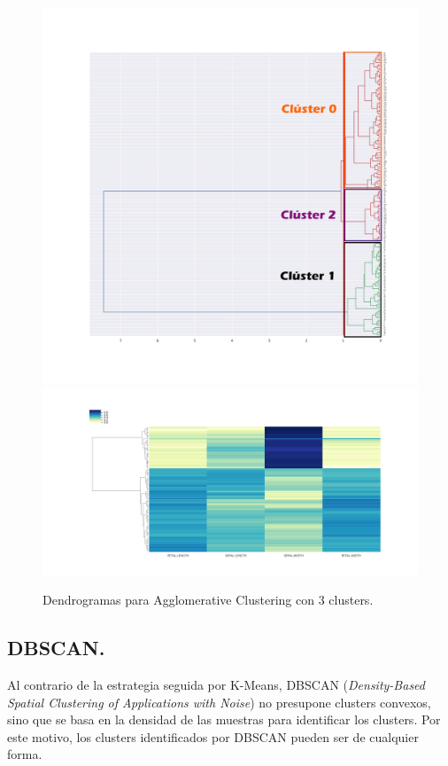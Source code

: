 \documentclass[a4paper, 20pt]{article}
\begin{document}
\begin{figure}[h]
\centering
\includegraphics[scale=0.35]{dani/dendrogramcolor.png}
\includegraphics[scale=0.35]{dani/dendscatAggClusterIRIS.png}
\caption{Dendrogramas para Agglomerative Clustering con 3 clusters.}
\label{dac}
\end{figure}

\clearpage

\subsection{DBSCAN.}

Al contrario de la estrategia seguida por K-Means, DBSCAN (\textit{Density-Based Spatial Clustering of Applications with Noise}) no presupone clusters convexos, sino que se basa en la densidad de las muestras para identificar los clusters. Por este motivo, los clusters identificados por DBSCAN pueden ser de cualquier forma.\\
\end{document}
